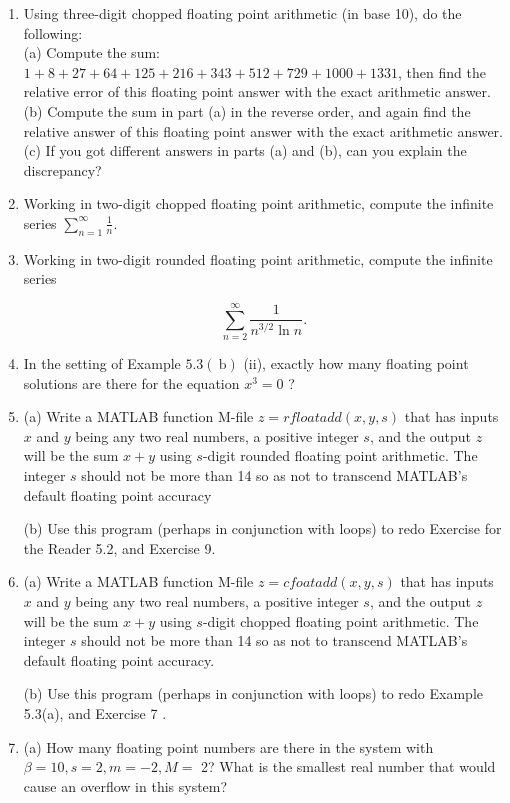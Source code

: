 \documentclass[../main.tex]{subfiles}
\begin{document}
\begin{enumerate}
\item Using three-digit chopped floating point arithmetic (in base 10), do the following:\\
(a) Compute the sum: $1+8+27+64+125+216+343+512+729+1000+1331$, then find the relative error of this floating point answer with the exact arithmetic answer.\\
(b) Compute the sum in part (a) in the reverse order, and again find the relative answer of this floating point answer with the exact arithmetic answer.\\
(c) If you got different answers in parts (a) and (b), can you explain the discrepancy?

\item Working in two-digit chopped floating point arithmetic, compute the infinite series $\sum_{n=1}^{\infty} \frac{1}{n}$.
\item Working in two-digit rounded floating point arithmetic, compute the infinite series

$$
\sum_{n=2}^{\infty} \frac{1}{n^{3 / 2} \ln n} .
$$

\item In the setting of Example $5.3(\mathrm{~b})$ (ii), exactly how many floating point solutions are there for the equation $x^{3}=0$ ?

\item (a) Write a MATLAB function M-file $z=rfloatadd(x, y, s)$ that has inputs $x$ and $y$ being any two real numbers, a positive integer $s$, and the output $z$ will be the sum $x+y$ using $s$-digit rounded floating point arithmetic. The integer $s$ should not be more than 14 so as not to transcend MATLAB's default floating point accuracy

(b) Use this program (perhaps in conjunction with loops) to redo Exercise for the Reader 5.2, and Exercise 9.

\item (a) Write a MATLAB function M-file $z=cfoatadd(x, y, s)$ that has inputs $x$ and $y$ being any two real numbers, a positive integer $s$, and the output $z$ will be the sum $x+y$ using $s$-digit chopped floating point arithmetic. The integer $s$ should not be more than 14 so as not to transcend MATLAB's default floating point accuracy.

(b) Use this program (perhaps in conjunction with loops) to redo Example 5.3(a), and Exercise 7 .

\item (a) How many floating point numbers are there in the system with $\beta=10, s=2, m=-2, M=$ 2? What is the smallest real number that would cause an overflow in this system?



\end{enumerate}
\end{document}
